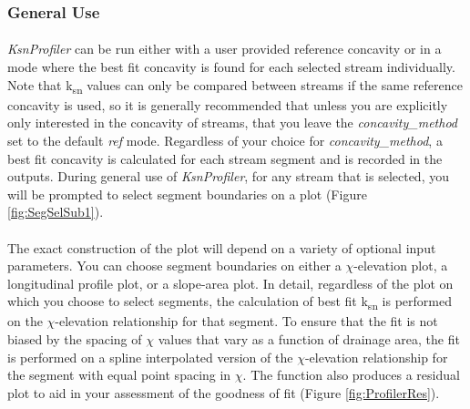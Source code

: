 \subsubsection{General Use}
\paragraph{}\textit{KsnProfiler} can be run either with a user provided reference concavity or in a mode where the best fit concavity is found for each selected stream individually. Note that k\textsubscript{sn} values can only be compared between streams if the same reference concavity is used, so it is generally recommended that unless you are explicitly only interested in the concavity of streams, that you leave the \textit{concavity\_method} set to the default \textit{ref} mode. Regardless of your choice for \textit{concavity\_method}, a best fit concavity is calculated for each stream segment and is recorded in the outputs. During general use of \textit{KsnProfiler}, for any stream that is selected, you will be prompted to select segment boundaries on a plot (Figure \ref{fig:SegSelSub1}). 

\paragraph{}The exact construction of the plot will depend on a variety of optional input parameters. You can choose segment boundaries on either a $\chi$-elevation plot, a longitudinal profile plot, or a slope-area plot. In detail, regardless of the plot on which you choose to select segments, the calculation of best fit k\textsubscript{sn} is performed on the $\chi$-elevation relationship for that segment. To ensure that the fit is not biased by the spacing of $\chi$ values that vary as a function of drainage area, the fit is performed on a spline interpolated version of the $\chi$-elevation relationship for the segment with equal point spacing in $\chi$. The function also produces a residual plot to aid in your assessment of the goodness of fit (Figure \ref{fig:ProfilerRes}).

